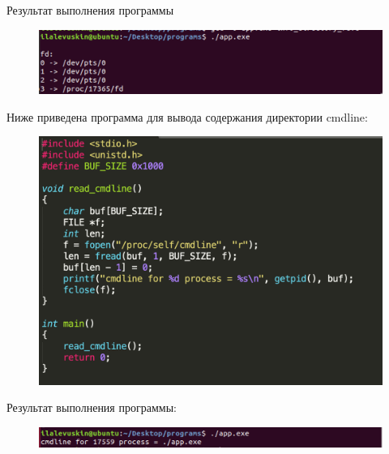 \documentclass[a4paper,12pt]{article}
\begin{document}
	Результат выполнения программы
	
	\begin{figure}[h!]
		\begin{center}
			{\includegraphics[scale = 0.7]{fd.png}}
			\label{ris:fd}
		\end{center}
	\end{figure}
	
	\newpage
	
	Ниже приведена программа для вывода содержания директории cmdline:
	
	\begin{figure}[h!]
		\begin{center}
			{\includegraphics[scale = 0.7]{cmdline1.png}}
			\label{ris:cmdline1}
		\end{center}
	\end{figure}
	
	Результат выполнения программы:
	
	\begin{figure}[h!]
		\begin{center}
			{\includegraphics[scale = 0.7]{cmdline.png}}
			\label{ris:cmdline}
		\end{center}
	\end{figure}
	
\end{document}
